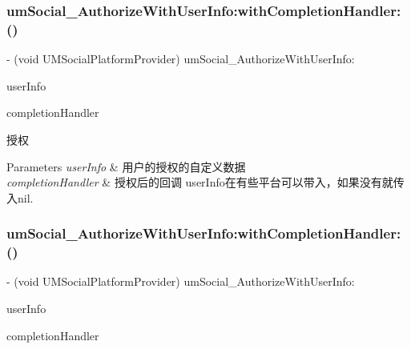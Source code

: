\subsubsection{\texorpdfstring{um\+Social\+\_\+\+Authorize\+With\+User\+Info\+:with\+Completion\+Handler\+:()}{umSocial\_AuthorizeWithUserInfo:withCompletionHandler:()}\hspace{0.1cm}{\footnotesize\ttfamily [1/2]}}
{\footnotesize\ttfamily -\/ (void U\+M\+Social\+Platform\+Provider) um\+Social\+\_\+\+Authorize\+With\+User\+Info\+: \begin{DoxyParamCaption}\item[{(N\+S\+Dictionary $\ast$)}]{user\+Info }\item[{withCompletionHandler:(U\+M\+Social\+Request\+Completion\+Handler)}]{completion\+Handler }\end{DoxyParamCaption}}

授权


\begin{DoxyParams}{Parameters}
{\em user\+Info} & 用户的授权的自定义数据 \\
\hline
{\em completion\+Handler} & 授权后的回调  user\+Info在有些平台可以带入，如果没有就传入nil. \\
\hline
\end{DoxyParams}
\mbox{\label{protocol_u_m_social_platform_provider_01-p_ae1ebabde25fa467a8dbd3360c69f1cae}} 
\subsubsection{\texorpdfstring{um\+Social\+\_\+\+Authorize\+With\+User\+Info\+:with\+Completion\+Handler\+:()}{umSocial\_AuthorizeWithUserInfo:withCompletionHandler:()}\hspace{0.1cm}{\footnotesize\ttfamily [2/2]}}
{\footnotesize\ttfamily -\/ (void U\+M\+Social\+Platform\+Provider) um\+Social\+\_\+\+Authorize\+With\+User\+Info\+: \begin{DoxyParamCaption}\item[{(N\+S\+Dictionary $\ast$)}]{user\+Info }\item[{withCompletionHandler:(U\+M\+Social\+Request\+Completion\+Handler)}]{completion\+Handler }\end{DoxyParamCaption}}

